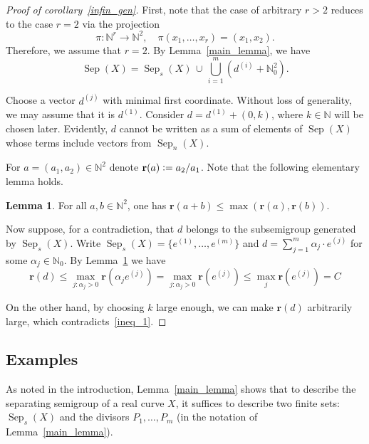 \documentclass[x11names,oneside,11pt]{amsart}
\theoremstyle{definition}
\newtheorem{lemma}{Lemma}
\theoremstyle{remark}
\DeclareMathOperator{\Sep}{Sep}
\newcommand{\eqdef}{\vcentcolon=}
\newcommand{\N}{\mathbb{N}}
\newcommand{\rat}{\mathbf{r}}
\begin{document}
  \begin{proof}[Proof of corollary~\ref{infin_gen}]
    First, note that the case of arbitrary $r > 2$ reduces to the case $r = 2$ via the projection
  \[
    \pi \colon \N^r \to \N^2, \quad \pi(x_1, \ldots, x_r) = (x_1, x_2).
  \]
  Therefore, we assume that $r = 2$. By Lemma~\ref{main_lemma}, we have
  \[
    \Sep(X) = \Sep_s(X) \,\cup\, \bigcup_{i=1}^{m} \left( d^{(i)} + \N_0^{2} \right).
  \]

  Choose a vector $d^{(j)}$ with minimal first coordinate. Without loss of generality, we may assume that it is $d^{(1)}$.  Consider $d = d^{(1)} + (0,k)$, where $k \in \N$ will be chosen later.  Evidently, $d$ cannot be written as a sum of elements of $\Sep(X)$ whose terms include vectors from $\Sep_n(X)$.

  For $a = (a_1,a_2) \in \N^2$ denote $\rat(a) \eqdef a_2/a_1$. Note that the following elementary lemma holds.
    
    \begin{lemma}\label{lemma_1} 
      For all $a, b \in \N^2$, one has $\rat(a+b) \leqslant \max(\rat(a), \rat(b))$. 
    \end{lemma}
    
  Now suppose, for a contradiction, that $d$ belongs to the subsemigroup generated by $\Sep_s(X)$. 
    Write $\Sep_s(X) = \{ e^{(1)}, \ldots, e^{(m)} \}$ and $d = \sum_{j=1}^{m} \alpha_j \cdot e^{(j)}$ for some $\alpha_j \in \N_0$. By Lemma~\ref{lemma_1} we have 
    \begin{equation}\tag{$\star$}
        \rat(d) \leqslant \max\limits_{j \colon \alpha_j > 0}{\rat(\alpha_j e^{(j)})} = \max\limits_{j \colon \alpha_j > 0}{\rat(e^{(j)})} \leqslant \max_{j}\rat(e^{(j)})=C \label{ineq_1}
    \end{equation}
    
  On the other hand, by choosing $k$ large enough, we can make $\rat(d)$ arbitrarily large, which contradicts~\eqref{ineq_1}.  
  \end{proof}

  \subsection{Examples}\label{examples}

    As noted in the introduction, Lemma~\ref{main_lemma} shows that to describe the separating semigroup of a real curve $X$, it suffices to describe two finite sets: $\Sep_s(X)$ and the divisors $P_1, \ldots, P_m$ (in the notation of Lemma~\ref{main_lemma}).
\end{document}
